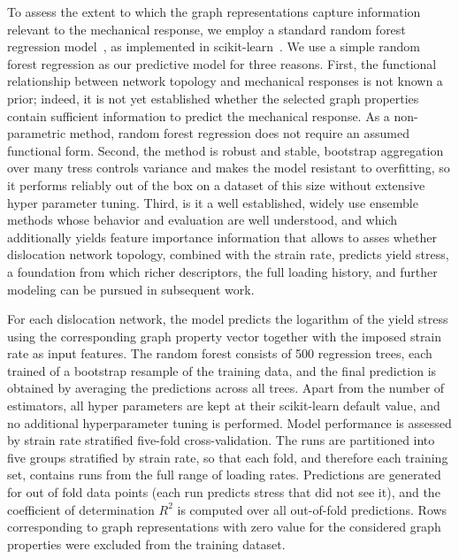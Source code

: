 \documentclass[pdflatex,sn-mathphys-num]{sn-jnl}%
\theoremstyle{thmstyleone}%
\theoremstyle{thmstyletwo}%
\theoremstyle{thmstylethree}%
\newcommand{\gl}[1]{{\color{blue}{#1}}}
\begin{document}
To assess the extent to which the graph representations capture information relevant to the mechanical response, we employ a standard random forest regression model~\cite{Breimam_2001}, as implemented in scikit-learn~\cite{Pedregosa_Scikit-learn_Machine_Learning_2011}. We use a simple random forest regression as our predictive model for three reasons.
First, the functional relationship between network topology and mechanical responses is not known a prior; indeed, it is not yet established whether the selected graph properties contain sufficient information to predict the mechanical response.
As a non-parametric method, random forest regression does not require an assumed functional form.
Second, the method is robust and stable, bootstrap aggregation over many tress controls variance and makes the model resistant to overfitting, so it performs reliably out of the box on a dataset of this size without extensive hyper parameter tuning.
Third, is it a well established, widely use ensemble methods whose behavior and evaluation are well understood, and which additionally yields feature importance information that allows to asses whether dislocation network topology, combined with the strain rate, predicts yield stress, a foundation from which richer descriptors, the full loading history, and further modeling can be pursued in subsequent work.

For each dislocation network, the model predicts the logarithm of the yield stress using the corresponding graph property vector together with the imposed strain rate as input features. The random forest consists of 500 regression trees, each trained of a bootstrap resample of the training data, and the final prediction is obtained by averaging the predictions across all trees.
Apart from the number of estimators, all hyper parameters are kept at their scikit-learn default value, and no additional hyperparameter tuning is performed. 
Model performance is assessed by strain rate stratified five-fold cross-validation.
The runs are partitioned into five groups stratified by strain rate, so that each fold, and therefore each training set, contains runs from the full range of loading rates.
Predictions are generated for out of fold data points (each run predicts stress that did not see it), and the coefficient of determination $R^2$ is computed over all out-of-fold predictions.
Rows corresponding to graph representations with zero value for the considered graph properties were excluded from the training dataset.
\end{document}
